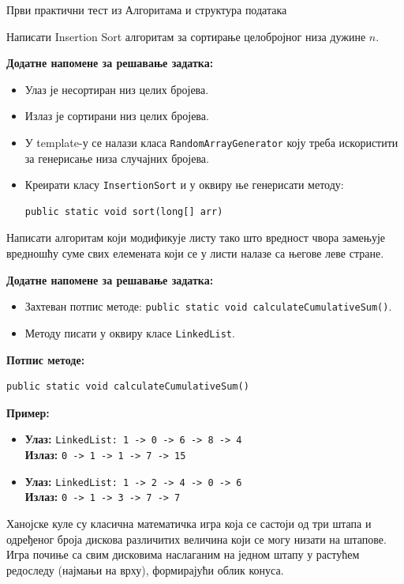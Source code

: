 
Први практични тест из Алгоритама и структура података

Написати Insertion Sort алгоритам за сортирање целобројног низа дужине $n$.

\textbf{Додатне напомене за решавање задатка:}
\begin{itemize}
	\item Улаз је несортиран низ целих бројева.
	\item Излаз је сортирани низ целих бројева.
	\item У template-у се налази класа \texttt{RandomArrayGenerator} коју треба искористити за генерисање низа случајних бројева.
	\item Креирати класу \texttt{InsertionSort} и у оквиру ње генерисати методу:
	\begin{Verbatim}[fontsize=\small]
public static void sort(long[] arr)
	\end{Verbatim}
\end{itemize}

Написати алгоритам који модификује листу тако што вредност чвора замењује вредношћу суме свих елемената који се у листи налазе са његове леве стране.

\textbf{Додатне напомене за решавање задатка:}
\begin{itemize}
	\item Захтеван потпис методе: \texttt{public static void calculateCumulativeSum()}.
	\item Методу писати у оквиру класе \texttt{LinkedList}.
\end{itemize}

\textbf{Потпис методе:}
\begin{Verbatim}[fontsize=\small]
public static void calculateCumulativeSum()
\end{Verbatim}

\textbf{Пример:}
\begin{itemize}
	\item \textbf{Улаз:} \texttt{LinkedList: 1 -> 0 -> 6 -> 8 -> 4} \\
		  \textbf{Излаз:} \texttt{0 -> 1 -> 1 -> 7 -> 15}
	\item \textbf{Улаз:} \texttt{LinkedList: 1 -> 2 -> 4 -> 0 -> 6} \\
		  \textbf{Излаз:} \texttt{0 -> 1 -> 3 -> 7 -> 7}
\end{itemize}

Ханојске куле су класична математичка игра која се састоји од три штапа и одређеног броја дискова различитих величина који се могу низати на штапове. Игра почиње са свим дисковима наслаганим на једном штапу у растућем редоследу (најмањи на врху), формирајући облик конуса.

